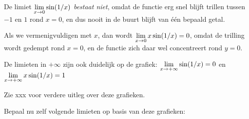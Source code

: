 \documentclass{ximera}
\begin{document}
\begin{example}
\begin{image}[\textwidth]
\quad

\end{image}

De limiet $\limx \sin(1/x)$ \textit{bestaat niet}, omdat de functie erg snel blijft trillen tussen $-1$ en $1$ rond $x=0$, en dus nooit in de buurt blijft van één bepaald getal. 

Als we vermenigvuldigen met $x$, dan wordt $\limx x\sin(1/x) = 0$, omdat de trilling wordt gedempt rond $x=0$, en de functie zich daar wel concentreert rond  $y=0$.


De limieten in $+\infty$ zijn ook duidelijk op de grafiek: $\limxi \sin(1/x) = 0$ en $\limxi x\sin(1/x) = 1$

Zie xxx voor verdere uitleg over deze grafieken.

Bepaal nu zelf volgende limieten op basis van deze grafieken:


\def\isA{}
\def\isB{}
\def\isC{}
\def\isD{}
\def\isE{}
\def\isF{}

\newcommand{\localoefoptions}{\wordChoice{\choice[\isA]{$+\infty$}\choice[\isB]{$-\infty$}\choice[\isC]{0}\choice[\isD]{1}\choice[\isE]{bestaat niet}\choice[\isF]{andere oplossing}}}



\end{example}
\end{document}
